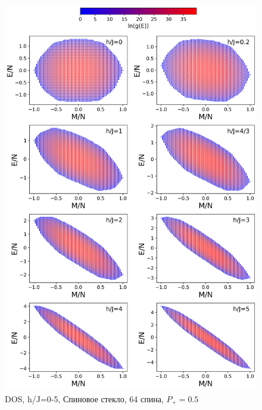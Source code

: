 \documentclass[utf8, babel, sor, jor, amsmath, amssymb, reprint]{elsarticle} %
\begin{document}
\begin{figure}[H]
		\centering
		\includegraphics[width=1\linewidth]{pictures/HDOS_SG_64_J0.png}
	\caption{DOS, h/J=0-5, Спиновое стекло, 64 спина, $P_+ = 0.5$}
	\label{fig:HDOS_glass}
\end{figure}
\end{document}
